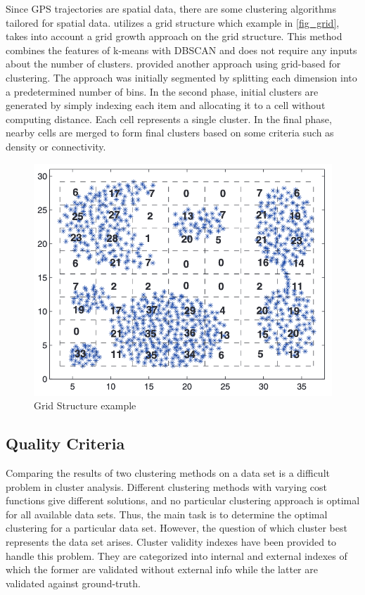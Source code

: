 \documentclass[a4paper, 12pt]{article}
\begin{document}
Since GPS trajectories are spatial data, there are some clustering algorithms tailored for spatial data. \citet{zhao2015grid} utilizes a grid structure which example in \autoref{fig_grid}, takes into account a grid growth approach on the grid structure. This method combines the features of k-means with DBSCAN and does not require any inputs about the number of clusters. \citet{rezaei2018real} provided another approach using grid-based for clustering. The approach was initially segmented by splitting each dimension into a predetermined number of bins. In the second phase, initial clusters are generated by simply indexing each item and allocating it to a cell without computing distance. Each cell represents a single cluster. In the final phase, nearby cells are merged to form final clusters based on some criteria such as density or connectivity.

\begin{figure}[htbp!]
    \centering
    \includegraphics[width=1\textwidth]{grid_structure.png}
    \caption{Grid Structure example \citep{zhao2015grid}}
    \label{fig_grid}
\end{figure}

\subsection{Quality Criteria}

Comparing the results of two clustering methods on a data set is a difficult problem in cluster analysis. Different clustering methods with varying cost functions give different solutions, and no particular clustering approach is optimal for all available data sets. Thus, the main task is to determine the optimal clustering for a particular data set. However, the question of which cluster best represents the data set arises. Cluster validity indexes have been provided to handle this problem. They are categorized into internal and external indexes of which the former are validated without external info while the latter are validated against ground-truth.
\end{document}
